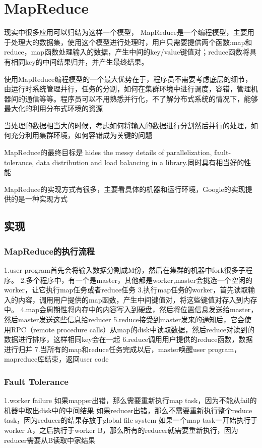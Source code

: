 \section{MapReduce}
现实中很多应用可以归结为这样一个模型，
MapReduce是一个编程模型，主要用于处理大的数据集，使用这个模型进行处理时，用户只需要提供两个函数:map和reduce，map函数处理输入的数据，产生中间的key/value键值对；reduce函数将具有相同key的中间结果归并，并产生最终结果。

使用MapReduce编程模型的一个最大优势在于，程序员不需要考虑底层的细节，由运行时系统管理并行，任务的分割，如何在集群环境中进行调度，容错，管理机器间的通信等等。程序员可以不用熟悉并行化，不了解分布式系统的情况下，能够最大化的利用分布式环境的资源

当处理的数据相当大的时候，考虑如何将输入的数据进行分割然后并行的处理，如何充分利用集群环境，如何容错成为关键的问题

MapReduce的最终目标是
hides the messy details of parallelization, fault-tolerance, data distribution and load balancing in a library.同时具有相当好的性能

MapReduce的实现方式有很多，主要看具体的机器和运行环境，Google的实现提供的是一种实现方式

\subsection{实现}
\subsubsection{MapReduce的执行流程}
1.user program首先会将输入数据分割成M份，然后在集群的机器中fork很多子程序。
2.多个程序中，有一个是master，其他都是worker,master会挑选一个空闲的worker，让它执行map任务或者reduce任务
3.执行map任务的worker，首先读取输入的内容，调用用户提供的map函数，产生中间键值对，将这些键值对存入到内存中。
4.map会周期性将内存中的内容写入到硬盘，然后将位置信息发送给master，然后master发送这些信息给reducer
5.reduce接受到master发来的通知后，它会使用RPC（remote procedure calls）从map的disk中读取数据，然后reduce对读到的数据进行排序，这样相同key会在一起
6.reduce调用用户提供的reduce函数，数据进行归并
7.当所有的map和reduce任务完成以后，master唤醒user program，mapreduce库结束，返回user code

\subsubsection{Fault Tolerance}
1.worker failure
如果mapper出错，那么需要重新执行map task，因为不能从fail的机器中取出disk中的中间结果
如果reducer出错，那么不需要重新执行整个reduce task，因为reducer的结果存放于global file system
如果一个map task一开始执行于worker A，之后执行于worker B，那么所有的reducer就需要重新执行，因为reducer需要从B读取中家结果

